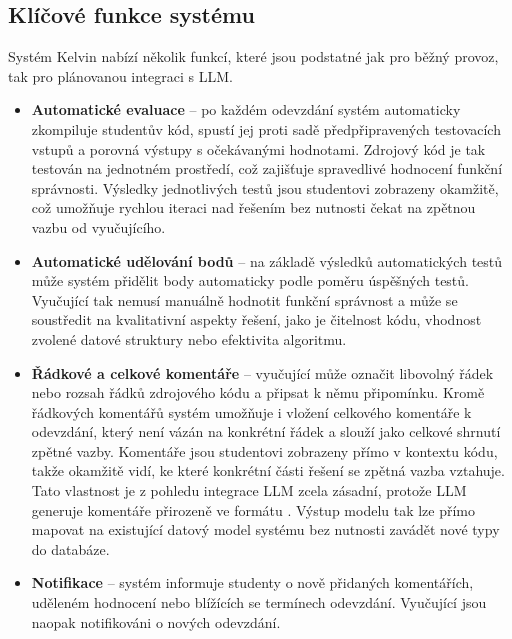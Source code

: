 \subsection{Klíčové funkce systému}
\label{subsec:kelvin-features}

Systém Kelvin nabízí několik funkcí, které jsou podstatné jak pro běžný provoz, tak pro plánovanou integraci s LLM\@.

\begin{itemize}
    \item \textbf{Automatické evaluace} -- po každém odevzdání systém automaticky zkompiluje studentův kód, spustí jej proti sadě předpřipravených testovacích vstupů a porovná výstupy s očekávanými hodnotami.
    Zdrojový kód je tak testován na jednotném prostředí, což zajišťuje spravedlivé hodnocení funkční správnosti.
    Výsledky jednotlivých testů jsou studentovi zobrazeny okamžitě, což umožňuje rychlou iteraci nad řešením bez nutnosti čekat na zpětnou vazbu od vyučujícího.

    \item \textbf{Automatické udělování bodů} -- na základě výsledků automatických testů může systém přidělit body automaticky podle poměru úspěšných testů.
    Vyučující tak nemusí manuálně hodnotit funkční správnost a může se soustředit na kvalitativní aspekty řešení, jako je čitelnost kódu, vhodnost zvolené datové struktury nebo efektivita algoritmu.

    \item \textbf{Řádkové a celkové komentáře} -- vyučující může označit libovolný řádek nebo rozsah řádků zdrojového kódu a připsat k němu připomínku.
    Kromě řádkových komentářů systém umožňuje i vložení celkového komentáře k odevzdání, který není vázán na konkrétní řádek a slouží jako celkové shrnutí zpětné vazby.
    Komentáře jsou studentovi zobrazeny přímo v kontextu kódu, takže okamžitě vidí, ke které konkrétní části řešení se zpětná vazba vztahuje.
    Tato vlastnost je z pohledu integrace LLM zcela zásadní, protože LLM generuje komentáře přirozeně ve formátu .
    Výstup modelu tak lze přímo mapovat na existující datový model systému bez nutnosti zavádět nové typy do databáze.

    \item \textbf{Notifikace} -- systém informuje studenty o nově přidaných komentářích, uděleném hodnocení nebo blížících se termínech odevzdání.
    Vyučující jsou naopak notifikováni o nových odevzdání.
\end{itemize}

\endinput
